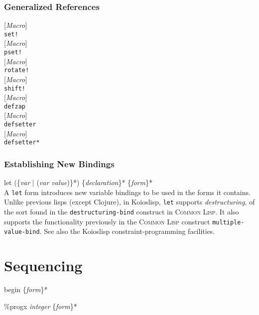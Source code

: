 \documentclass[10pt]{book}
\newenvironment{defother}[2]{[\textit{#1}]\\\texttt{#2}}{\\}
\newenvironment{defmacro}[1]{\begin{defother}{Macro}{#1}}{\end{defother}}
\newenvironment{special-form}[1]{\begin{defother}{Special form}{#1}}{\end{defother}}
\begin{document}
\subsubsection{Generalized References}
\begin{defmacro}{set!}\end{defmacro}%
\begin{defmacro}{pset!}\end{defmacro}
\begin{defmacro}{rotate!}\end{defmacro}
\begin{defmacro}{shift!}\end{defmacro}
\begin{defmacro}{defzap}\end{defmacro}%
\begin{defmacro}{defsetter}\end{defmacro}%
\begin{defmacro}{defsetter*}\end{defmacro}%
\subsubsection{Establishing New Bindings}
\begin{special-form}{let} (\{\textit{var} | (\textit{var value})\}*) \{\textit{declaration}\}* \{\textit{form}\}*\\
A \texttt{let} form introduces new variable bindings to be used in the forms it contains.\\

Unlike previous lisps (except Clojure), in Koioslisp, \texttt{let} supports \textit{destructuring}, of the sort found in the \texttt{destructuring-bind} construct in \textsc{Common Lisp}. It also supports the functionality previously in the \textsc{Common Lisp} construct \texttt{multiple-value-bind}. See also the Koioslisp constraint-programming facilities.
\end{special-form}
\section{Sequencing}
\begin{special-form}{begin} \{\textit{form}\}*\end{special-form} %
\begin{special-form}{\%progx} \textit{integer} \{\textit{form}\}*\end{special-form}
\end{document}
